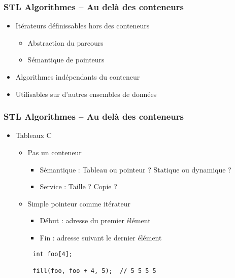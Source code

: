 \documentclass[C++.tex]{subfiles}
\begin{document}
\begin{frame}[fragile]
	\frametitle{STL Algorithmes -- Au delà des conteneurs}
	\begin{itemize}
		\item Itérateurs définissables hors des conteneurs
		\begin{itemize}
			\item Abstraction du parcours
			\item Sémantique de pointeurs
		\end{itemize}
		\item Algorithmes indépendants du conteneur
		\item Utilisables sur d'autres ensembles de données
	\end{itemize}
\end{frame}

\begin{frame}[fragile]
	\frametitle{STL Algorithmes -- Au delà des conteneurs}
	\begin{itemize}
		\item Tableaux C
		\begin{itemize}
			\item Pas un conteneur


			\begin{itemize}
				\item Sémantique : Tableau ou pointeur ? Statique ou dynamique ?
				\item Service : Taille ? Copie ?
			\end{itemize}
			\item Simple pointeur comme itérateur
			\begin{itemize}
				\item Début : adresse du premier élément
				\item Fin : adresse suivant le dernier élément
			\end{itemize}
		\end{itemize}
	\end{itemize}

	\begin{verbatim}
		int foo[4];

		fill(foo, foo + 4, 5);  // 5 5 5 5
	\end{verbatim}
\end{frame}
\end{document}

